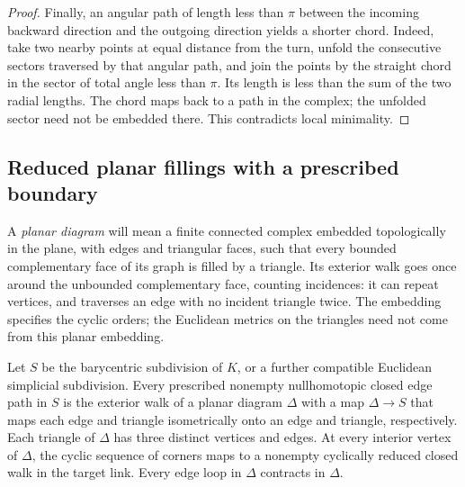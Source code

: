 \begin{proof}
Finally, an angular path of length less than $\pi$ between the incoming
backward direction and the outgoing direction yields a shorter chord.
Indeed, take two nearby points at equal distance from the turn, unfold
the consecutive sectors traversed by that angular path, and join the
points by the straight chord in the sector of total angle less than
$\pi$. Its length is less than the sum of the two radial lengths.
The chord maps back to a path in the complex; the unfolded sector need
not be embedded there. This contradicts local minimality.
\end{proof}

\subsection{Reduced planar fillings with a prescribed boundary}

A \emph{planar diagram} will mean a finite connected complex embedded
topologically in the plane, with edges and triangular faces, such that
every bounded complementary face of its graph is filled by a triangle.
Its exterior walk goes once around the unbounded complementary face,
counting incidences: it can repeat vertices, and traverses an edge with
no incident triangle twice. The embedding specifies the cyclic orders;
the Euclidean metrics on the triangles need not come from this planar
embedding.

\begin{lemma}
\label{lem:reduced-diagrams}
Let $S$ be the barycentric subdivision of $K$, or a further compatible
Euclidean simplicial subdivision. Every prescribed nonempty
nullhomotopic closed edge path in $S$ is the exterior walk of a planar
diagram $\Delta$ with a map $\Delta\to S$ that maps each edge and triangle
isometrically onto an edge and triangle, respectively. Each triangle of
$\Delta$ has three distinct vertices and edges. At every interior
vertex of $\Delta$, the cyclic sequence of corners maps to a nonempty
cyclically reduced closed walk in the target link.
Every edge loop in $\Delta$ contracts in $\Delta$.
\end{lemma}

